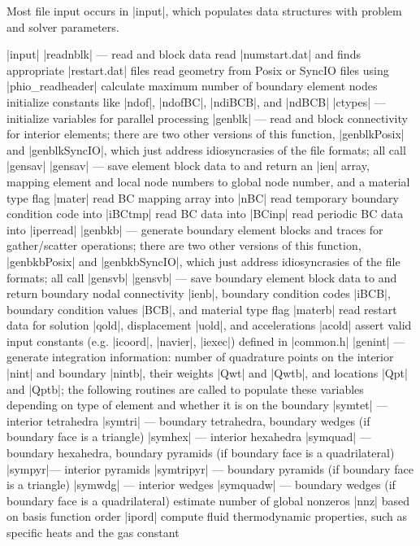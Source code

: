 \documentclass[11pt]{article}
\begin{document}
Most file input occurs in |input|, which populates data structures with problem and solver parameters.
\begin{outline}[deep]
\1 |input|
	\2 |readnblk| --- read and block data
		\3 read |numstart.dat| and finds appropriate |restart.dat| files
		\3 read geometry from Posix or SyncIO files using |phio_readheader|
		\3 calculate maximum number of boundary element nodes
		\3 initialize constants like |ndof|, |ndofBC|, |ndiBCB|, and |ndBCB|
		\3 |ctypes| --- initialize variables for parallel processing
		\3 |genblk| --- read and block connectivity for interior elements; there are two other versions of this function, |genblkPosix| and |genblkSyncIO|, which just address idiosyncrasies of the file formats; all call |gensav|
			\4 |gensav| --- save element block data to and return an |ien| array, mapping element and local node numbers to global node number, and a material type flag |mater|
		\3 read BC mapping array into |nBC|
		\3 read temporary boundary condition code into |iBCtmp|
		\3 read BC data into |BCinp|
		\3 read periodic BC data into |iperread|
		\3 |genbkb| --- generate boundary element blocks and traces for gather/scatter operations; there are two other versions of this function, |genbkbPosix| and |genbkbSyncIO|, which just address idiosyncrasies of the file formats; all call |gensvb|
			\4 |gensvb| --- save boundary element block data to and return boundary nodal connectivity |ienb|, boundary condition codes |iBCB|, boundary condition values |BCB|, and material type flag |materb|
		\3 read restart data for solution |qold|, displacement |uold|, and accelerations |acold|
	\2 assert valid input constants (e.g. |icoord|, |navier|, |iexec|) defined in |common.h|
	\2 |genint| --- generate integration information: number of quadrature points on the interior |nint| and boundary |nintb|, their weights |Qwt| and |Qwtb|, and locations |Qpt| and |Qptb|; the following routines are called to populate these variables depending on type of element and whether it is on the boundary
		\3 |symtet| --- interior tetrahedra
		\3 |symtri| --- boundary tetrahedra, boundary wedges (if boundary face is a triangle)
		\3 |symhex| --- interior hexahedra
		\3 |symquad| --- boundary hexahedra, boundary pyramids (if boundary face is a quadrilateral)
		\3 |sympyr|--- interior pyramids
		\3 |symtripyr| --- boundary pyramids (if boundary face is a triangle)
		\3 |symwdg| --- interior wedges
		\3 |symquadw| --- boundary wedges (if boundary face is a quadrilateral)
	\2 estimate number of global nonzeros |nnz| based on basis function order |ipord|
	\2 compute fluid thermodynamic properties, such as specific heats and the gas constant
\end{outline}
\end{document}
